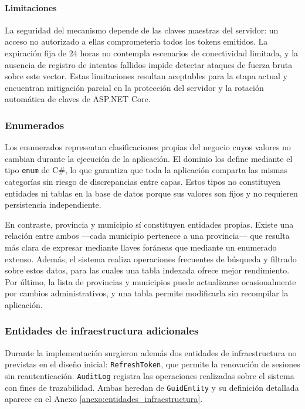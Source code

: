 \paragraph{Limitaciones}

La seguridad del mecanismo depende de las claves maestras del servidor: un acceso no autorizado a ellas comprometería todos los tokens emitidos. La expiración fija de 24 horas no contempla escenarios de conectividad limitada, y la ausencia de registro de intentos fallidos impide detectar ataques de fuerza bruta sobre este vector. 
Estas limitaciones resultan aceptables para la etapa actual y encuentran mitigación parcial en la protección del servidor y la rotación automática de claves de ASP.NET Core.

\subsubsection{Enumerados}

Los enumerados representan clasificaciones propias del negocio cuyos valores no cambian durante la ejecución de la aplicación. El dominio los define mediante el tipo \texttt{enum} de C\#, lo que garantiza que toda la aplicación comparta las mismas categorías sin riesgo de discrepancias entre capas. Estos tipos no constituyen entidades ni tablas en la base de datos porque sus valores son fijos y no requieren persistencia independiente.

En contraste, provincia y municipio sí constituyen entidades propias.
Existe una relación entre ambos —cada municipio pertenece a una provincia— que resulta más clara de expresar mediante llaves foráneas que mediante un enumerado extenso. 
Además, el sistema realiza operaciones frecuentes de búsqueda y filtrado sobre estos datos, para las cuales una tabla indexada ofrece mejor rendimiento. 
Por último, la lista de provincias y municipios puede actualizarse ocasionalmente por cambios administrativos, y una tabla permite modificarla sin recompilar la aplicación.

\subsubsection{Entidades de infraestructura adicionales}
Durante la implementación surgieron además dos entidades de infraestructura no previstas en el diseño inicial: \texttt{RefreshToken}, que permite la renovación de sesiones sin reautenticación.
\texttt{AuditLog} registra las operaciones realizadas sobre el sistema con fines de trazabilidad.
Ambas heredan de \texttt{GuidEntity} y su definición detallada aparece en el Anexo \ref{anexo:entidades_infraestructura}.


